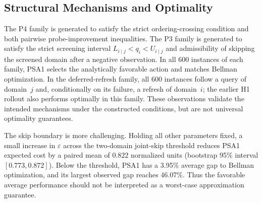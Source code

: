 \subsection{Structural Mechanisms and Optimality}
\begin{table}[t]
\caption{PSA1 cost savings relative to query-only and optimal
no-refresh policies, and mean gap to Bellman optimum.}
\label{tab:synthetic_families}
\centering
{}
\end{table}
The P4 family is generated to satisfy the strict ordering-crossing
condition and both pairwise probe-improvement inequalities. The P3
family is generated to satisfy the strict screening interval
$L_{i\mid j}<q_i<U_{i\mid j}$ and admissibility of skipping the
screened domain after a negative observation. In all 600 instances of
each family, PSA1 selects the analytically favorable action and
matches Bellman optimization. In the deferred-refresh family, all
600 instances follow a query of domain~$j$ and, conditionally on its
failure, a refresh of domain~$i$; the earlier H1 rollout also performs
optimally in this family. These observations validate the intended
mechanisms under the constructed conditions, but are not universal
optimality guarantees.

The skip boundary is more challenging. Holding all other parameters
fixed, a small increase in $\varepsilon$ across the two-domain
joint-skip threshold reduces PSA1 expected cost by a paired mean of
$0.822$ normalized units (bootstrap 95\% interval
$[0.773,0.872]$). Below the threshold, PSA1 has a 3.95\% average
gap to Bellman optimization, and its largest observed gap reaches
46.07\%. Thus the favorable average performance should not be
interpreted as a worst-case approximation guarantee.

